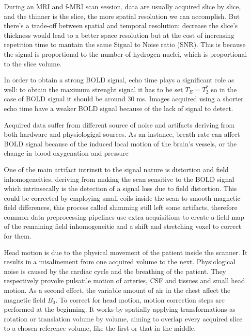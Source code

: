 \documentclass[a4paper,11pt]{article}
\begin{document}
During an MRI and f-MRI scan session, data are usually acquired slice by slice, and the thinner is the slice, the more spatial resolution we can accomplish.
But there's a trade-off between spatial and temporal resolution: decrease the slice's thickness would lead to a better space resolution but at the cost of increasing repetition time to mantain the same Signal to Noise ratio (SNR).
This is because the signal is proportional to the number of hydrogen nuclei, which is proportional to the slice volume.

In order to obtain a strong BOLD signal, echo time plays a significant role as well: to obtain the maximum strenght signal it has to be set $T_E = T_2^{\ast}$ so in the case of BOLD signal it should be around 30 ms.
Images acquired using a shorter echo time have a weaker BOLD signal because of the lack of signal to detect. \cite{Triantafyllou2011}

Acquired data suffer from different source of noise and artifacts deriving from both hardware and physiologigal sources.
As an instance, breath rate can affect BOLD signal because of the induced local motion of the brain's vessels, or the change in blood oxygenation and pressure

One of the main artifact intrinsit to the signal nature is distortion and field inhomogeneities, deriving from making the scan sensitive to the BOLD signal which intrinsecally is the detection of a signal loss due to field distortion.
This could be corrected by employing small coils inside the scan to smooth magnetic field differences, this process called shimming still left some artifacts, therefore common data preprocessing pipelines use extra acquisitions to create a field map of the remaining field inhomogeneitie and a shift and stretching voxel to correct for them.

Head motion is due to the physical movement of the patient inside the scanner. It results in a misalinement from one acquired volume to the next.
Physiological noise is caused by the cardiac cycle and the breathing of the patient. They respectively provoke pulsatile motion of arteries, CSF and tissues and small head motion. As a second effect, the variable amount of air in the chest affect the magnetic field $B_0$.
To correct for head motion, motion correction steps are performed at the beginning. It works by spatially applying transformations as rotation or translation volume by volume, aiming to overlap every acquired slice to a chosen reference volume, like the first or that in the middle.
\end{document}
